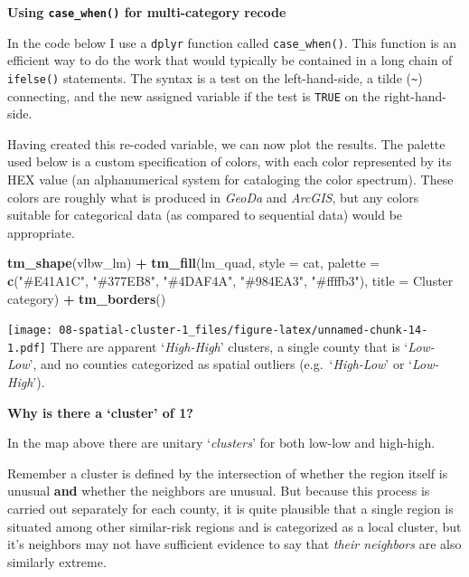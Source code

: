 \documentclass[
]{book}
\newenvironment{Shaded}{\begin{snugshade}}{\end{snugshade}}
\newcommand{\AttributeTok}[1]{\textcolor[rgb]{0.13,0.29,0.53}{#1}}
\newcommand{\FunctionTok}[1]{\textcolor[rgb]{0.13,0.29,0.53}{\textbf{#1}}}
\newcommand{\NormalTok}[1]{#1}
\newcommand{\SpecialCharTok}[1]{\textcolor[rgb]{0.81,0.36,0.00}{\textbf{#1}}}
\newcommand{\StringTok}[1]{\textcolor[rgb]{0.31,0.60,0.02}{#1}}
\newenvironment{rmdnote}[1]
  {
  \begin{itemize}
  \renewcommand{\labelitemi}{
    \raisebox{-.7\height}[0pt][0pt]{
      {\setkeys{Gin}{width=3em,keepaspectratio}\texttt{[image: images/\#1]}}
    }
  }
  \setlength{\fboxsep}{1em}
  \begin{note}
  \item
  }
  {
  \end{note}
  \end{itemize}
  }
\newenvironment{rmdtip}[1]
  {
  \begin{itemize}
  \renewcommand{\labelitemi}{
    \raisebox{-.7\height}[0pt][0pt]{
      {\setkeys{Gin}{width=3em,keepaspectratio}\texttt{[image: images/\#1]}}
    }
  }
  \setlength{\fboxsep}{1em}
  \begin{tip}
  \item
  }
  {
  \end{tip}
  \end{itemize}
  }
\begin{document}
\begin{rmdtip}{tip}
\textbf{Using \texttt{case\_when()} for multi-category recode}

In the code below I use a \texttt{dplyr} function called \texttt{case\_when()}. This function is an efficient way to do the work that would typically be contained in a long chain of \texttt{ifelse()} statements. The syntax is a test on the left-hand-side, a tilde (\texttt{\textasciitilde{}}) connecting, and the new assigned variable if the test is \texttt{TRUE} on the right-hand-side.

\end{rmdtip}

Having created this re-coded variable, we can now plot the results. The palette used below is a custom specification of colors, with each color represented by its HEX value (an alphanumerical system for cataloging the color spectrum). These colors are roughly what is produced in \emph{GeoDa} and \emph{ArcGIS}, but any colors suitable for categorical data (as compared to sequential data) would be appropriate.

\begin{Shaded}
\begin{Highlighting}[]
\FunctionTok{tm\_shape}\NormalTok{(vlbw\_lm) }\SpecialCharTok{+}
  \FunctionTok{tm\_fill}\NormalTok{(}\StringTok{\textquotesingle{}lm\_quad\textquotesingle{}}\NormalTok{,}
          \AttributeTok{style =} \StringTok{\textquotesingle{}cat\textquotesingle{}}\NormalTok{,}
          \AttributeTok{palette =} \FunctionTok{c}\NormalTok{(}\StringTok{"\#E41A1C"}\NormalTok{, }\StringTok{"\#377EB8"}\NormalTok{, }\StringTok{"\#4DAF4A"}\NormalTok{, }\StringTok{"\#984EA3"}\NormalTok{, }\StringTok{"\#ffffb3"}\NormalTok{),}
          \AttributeTok{title =} \StringTok{\textquotesingle{}Cluster category\textquotesingle{}}\NormalTok{) }\SpecialCharTok{+}
  \FunctionTok{tm\_borders}\NormalTok{()}
\end{Highlighting}
\end{Shaded}

\texttt{[image: 08-spatial-cluster-1\_files/figure-latex/unnamed-chunk-14-1.pdf]}
There are apparent `\emph{High-High}' clusters, a single county that is `\emph{Low-Low}', and no counties categorized as spatial outliers (e.g.~`\emph{High-Low}' or `\emph{Low-High}').

\begin{rmdnote}{note}
\textbf{Why is there a `cluster' of 1?}

In the map above there are unitary `\emph{clusters}' for both low-low and high-high.

Remember a cluster is defined by the intersection of whether the region itself is unusual \textbf{and} whether the neighbors are unusual. But because this process is carried out separately for each county, it is quite plausible that a single region is situated among other similar-risk regions and is categorized as a local cluster, but it's neighbors may not have sufficient evidence to say that \emph{their neighbors} are also similarly extreme.

\end{rmdnote}
\end{document}
